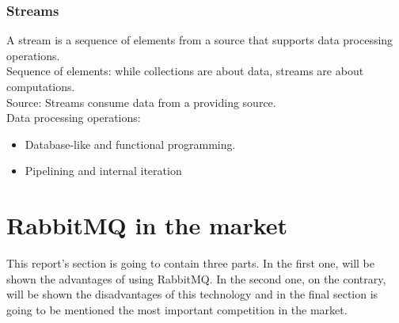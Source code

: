 \documentclass[12pt]{article}
\begin{document}
\subsubsection*{Streams}
A stream is a sequence of elements from a source that supports data processing operations.\\
Sequence of elements: while collections are about data, streams are about computations.\\
Source: Streams consume data from a providing source.\\
Data processing operations:

\begin{itemize}
    \item Database-like and functional programming.
    \item Pipelining and internal iteration
\end{itemize}

\section*{RabbitMQ in the  market}
This report's section is going to contain three parts. In the first one, will be shown the advantages of using RabbitMQ. In the second one, on the contrary, will be shown the disadvantages of this technology and in the final section is going to be mentioned the most important competition in the market.
\end{document}
